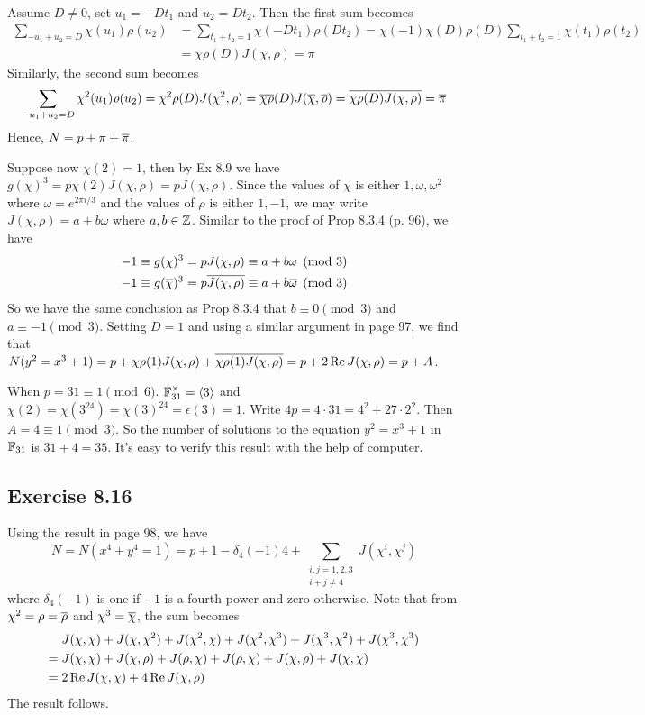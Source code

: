\documentclass[../I&R.tex]{subfiles}
\begin{document}
Assume $D\neq0$, set $u_1=-Dt_1$ and $u_2=Dt_2$. Then the first sum becomes
\begin{align*}
\sum_{-u_1+u_2=D} \chi(u_1)\rho(u_2) &= \sum_{t_1+t_2=1} \chi(-Dt_1)\rho(Dt_2) = \chi(-1)\chi(D)\rho(D)\sum_{t_1+t_2=1} \chi(t_1)\rho(t_2) \\
&= \chi\rho(D)J(\chi,\rho) = \pi
\end{align*}
Similarly, the second sum becomes
\begin{align*}
\sum_{-u_1+u_2=D} \chi^2(u_1)\rho(u_2) = \chi^2\rho(D)J(\chi^2,\rho) = \overline{\chi\rho}(D)J(\overline{\chi},\overline{\rho}) = \overline{\chi\rho(D)J(\chi,\rho)} = \overline{\pi}
\end{align*}
Hence, $N=p+\pi+\overline{\pi}$.

Suppose now $\chi(2)=1$, then by Ex 8.9 we have $g(\chi)^3=p\chi(2)J(\chi,\rho)=pJ(\chi,\rho)$. Since the values of $\chi$ is either $1,\omega,\omega^2$ where $\omega=e^{2\pi i/3}$ and the values of $\rho$ is either $1,-1$, we may write $J(\chi,\rho)=a+b\omega$ where $a,b\in\mathbb{Z}$. Similar to the proof of Prop 8.3.4 (p. 96), we have
\begin{align*}
-1\equiv g(\chi)^3 = pJ(\chi,\rho) \equiv a+b\omega \pmod{3} \\
-1\equiv g(\overline{\chi})^3 = p\overline{J(\chi,\rho)} \equiv a+b\overline{\omega} \pmod{3}
\end{align*}
So we have the same conclusion as Prop 8.3.4 that $b\equiv0\pmod{3}$ and $a\equiv-1\pmod{3}$. Setting $D=1$ and using a similar argument in page 97, we find that $N(y^2=x^3+1)=p+\chi\rho(1)J(\chi,\rho)+\overline{\chi\rho(1)J(\chi,\rho)}=p+2\operatorname{Re} J(\chi,\rho)=p+A$.

When $p=31\equiv1\pmod{6}$. $\mathbb{F}_{31}^\times=\langle3\rangle$ and $\chi(2)=\chi(3^{24})=\chi(3)^{24}=\epsilon(3)=1$. Write $4p=4\cdot31=4^2+27\cdot2^2$. Then $A=4\equiv1\pmod{3}$. So the number of solutions to the equation $y^2=x^3+1$ in $\mathbb{F}_{31}$ is $31+4=35$. It's easy to verify this result with the help of computer.

\subsection*{Exercise 8.16}

Using the result in page 98, we have $$N=N(x^4+y^4=1)=p+1-\delta_4(-1)4+\sum_{\substack{i,j=1,2,3\\ i+j\neq4}} J(\chi^i,\chi^j)$$ where $\delta_4(-1)$ is one if $-1$ is a fourth power and zero otherwise. Note that from $\chi^2=\rho=\overline{\rho}$ and $\chi^3=\overline{\chi}$, the sum becomes 
\begin{align*}
&J(\chi,\chi)+J(\chi,\chi^2)+J(\chi^2,\chi)+J(\chi^2,\chi^3)+J(\chi^3,\chi^2)+J(\chi^3,\chi^3) \\
={} &J(\chi,\chi)+J(\chi,\rho)+J(\rho,\chi)+J(\overline{\rho},\overline{\chi})+J(\overline{\chi},\overline{\rho})+J(\overline{\chi},\overline{\chi}) \\
={} &2\operatorname{Re} J(\chi,\chi)+4\operatorname{Re} J(\chi,\rho)
\end{align*}
The result follows.
\end{document}
